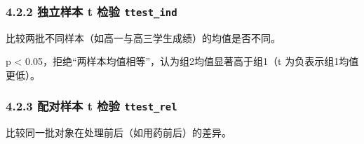 \subsubsection{\texorpdfstring{4.2.2 独立样本 t 检验
\texttt{ttest\_ind}}{4.2.2 独立样本 t 检验 ttest\_ind}}\label{ux72ecux7acbux6837ux672c-t-ux68c0ux9a8c-ttest_ind}

比较两批不同样本（如高一与高三学生成绩）的均值是否不同。

\begin{Shaded}
\begin{Highlighting}[]
\OperatorTok{=}\NormalTok{, }\OperatorTok{=}\NormalTok{)       }
\OperatorTok{=}\NormalTok{, }\OperatorTok{=}\NormalTok{)     }
\OperatorTok{=}
\NormalTok{(}\SpecialCharTok{\{}\SpecialCharTok{\{}\NormalTok{)}
\end{Highlighting}
\end{Shaded}

\begin{Shaded}
\begin{Highlighting}[]
\end{Highlighting}
\end{Shaded}

p \textless{} 0.05，拒绝``两样本均值相等''，认为组2均值显著高于组1（t
为负表示组1均值更低）。

\subsubsection{\texorpdfstring{4.2.3 配对样本 t 检验
\texttt{ttest\_rel}}{4.2.3 配对样本 t 检验 ttest\_rel}}\label{ux914dux5bf9ux6837ux672c-t-ux68c0ux9a8c-ttest_rel}

比较同一批对象在处理前后（如用药前后）的差异。

